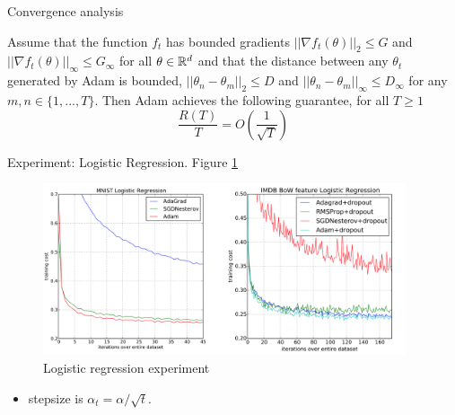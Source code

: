 \documentclass[english]{article}
\begin{document}

\item {Convergence analysis}

\begin{thm}
Assume that the function $f_t$ has bounded gradients $||\nabla f_t(\theta)||_2 \leq G$ and $||\nabla f_t(\theta)||_\infty \leq G_\infty$ for all $\theta \in \mathbb{R}^d$ and that the distance between any $\theta_t$  generated by Adam is bounded, $||\theta_n - \theta_m ||_2 \leq D$ and $||\theta_n - \theta_m||_\infty \leq D_\infty$ for any $m, n \in \{1, ..., T \}$. Then Adam achieves the following guarantee, for all $T \geq 1$
$$\frac{R(T)}{T} = O(\frac{1}{\sqrt{T}})$$
\end{thm}










\item {Experiment: Logistic Regression}. Figure \ref{experiment_logistic_regression}

\begin{figure}
 \centering
\includegraphics[width = 0.95\textwidth]{experiment_logistic_regression.png}
\caption{Logistic regression experiment}
\label{experiment_logistic_regression}
\end{figure}



\begin{itemize}
\item stepsize is $\alpha_t = \alpha/\sqrt{t}$.
\end{itemize}








\end{document}
